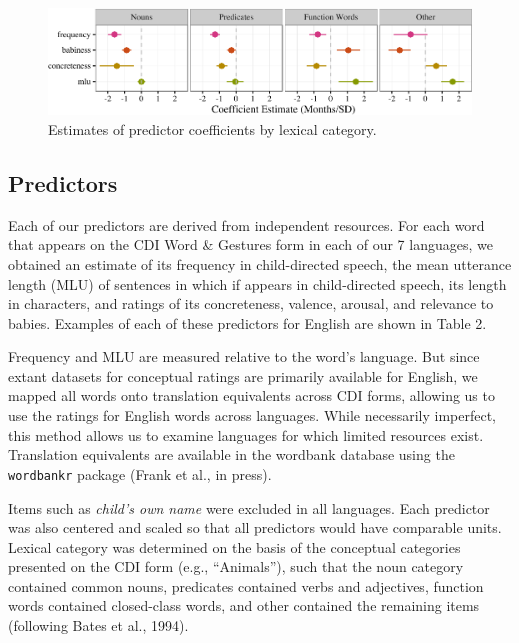 \documentclass[10pt, letterpaper]{article}
\newenvironment{CodeChunk}{}{}
\begin{document}
\begin{CodeChunk}
\begin{figure}[tb]

{\centering \includegraphics{figs/coefs_lexcat-1} 

}

\caption[Estimates of predictor coefficients by lexical category]{Estimates of predictor coefficients by lexical category.}\label{fig:coefs_lexcat}
\end{figure}
\end{CodeChunk}

\subsection{Predictors}\label{predictors}

Each of our predictors are derived from independent resources. For each
word that appears on the CDI Word \& Gestures form in each of our 7
languages, we obtained an estimate of its frequency in child-directed
speech, the mean utterance length (MLU) of sentences in which if appears
in child-directed speech, its length in characters, and ratings of its
concreteness, valence, arousal, and relevance to babies. Examples of
each of these predictors for English are shown in Table 2.

Frequency and MLU are measured relative to the word's language. But
since extant datasets for conceptual ratings are primarily available for
English, we mapped all words onto translation equivalents across CDI
forms, allowing us to use the ratings for English words across
languages. While necessarily imperfect, this method allows us to examine
languages for which limited resources exist. Translation equivalents are
available in the wordbank database using the \texttt{wordbankr} package
(Frank et al., in press).

Items such as \emph{child's own name} were excluded in all languages.
Each predictor was also centered and scaled so that all predictors would
have comparable units. Lexical category was determined on the basis of
the conceptual categories presented on the CDI form (e.g., ``Animals''),
such that the noun category contained common nouns, predicates contained
verbs and adjectives, function words contained closed-class words, and
other contained the remaining items (following Bates et al., 1994).
\end{document}
